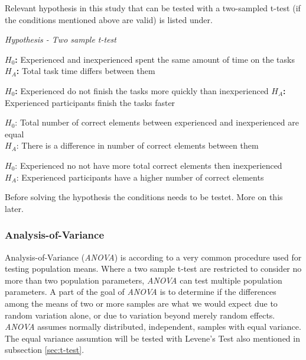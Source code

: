 Relevant hypothesis in this study that can be tested with a two-sampled t-test (if the conditions mentioned above are valid) is listed under. \newline

\begin{framed}{\noindent\centering
		
		\textit{Hypothesis - Two sample t-test} \newline
		
		\textbf{$H_{0}$:} Experienced and inexperienced spent the same amount of time on the tasks\\
		\textbf{$H_{A}$:} Total task time differs between them \newline
		
		\textbf{$H_{0}$:} Experienced do not finish the tasks more quickly than inexperienced\newline
		\textbf{$H_{A}$:} Experienced participants finish the tasks faster\newline
		
		$H_{0}$: Total number of correct elements between experienced and inexperienced are equal \\
		$H_{A}$: There is a difference in number of correct elements between them\newline
		
		$H_{0}$: Experienced no not have more total correct elements then inexperienced\\
		$H_{A}$: Experienced participants have a higher number of correct elements\newline
		
		\par}
\end{framed}

Before solving the hypothesis the conditions needs to be testet. More on this later. %

\subsubsection[ANOVA]{Analysis-of-Variance}\label{sec:anova}
Analysis-of-Variance (\textit{ANOVA}) is according to \cite{Walpole2012} a very common procedure used for testing population means. Where a two sample t-test are restricted to consider no more than two population parameters, \textit{ANOVA} can test multiple population parameters. A part of the goal of \textit{ANOVA} is to determine if the differences among the means of two or more samples are what we would expect due to random variation alone, or due to variation beyond merely random effects. \textit{ANOVA} assumes normally distributed, independent, samples with equal variance. The equal variance assumtion will be tested with Levene's Test also mentioned in subsection \ref{sec:t-test}. 

